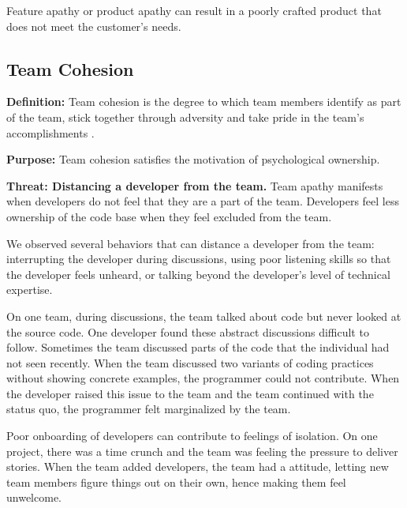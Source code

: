 
Feature apathy or product apathy can result in a poorly crafted product that does not meet the customer's needs.

\subsection{Team Cohesion}
\textbf{Definition:} Team cohesion is the degree to which team members identify as part of the team, stick together through adversity and take pride in the team's accomplishments \cite{Bollen1990Perceived, Beal2003Cohesion, Whitworth2007Motivation}.

\textbf{Purpose:} Team cohesion satisfies the  motivation of psychological ownership.

\textbf{Threat: Distancing a developer from the team.} Team apathy manifests when developers do not feel that they are a part of the team. Developers feel less ownership of the code base when they feel excluded from the team.

We observed several behaviors that can distance a developer from the team: interrupting the developer during discussions, using poor listening skills so that the developer feels unheard, or talking beyond the developer's level of technical expertise. 

On one team, during discussions, the team talked about code but never looked at the source code. One developer found these abstract discussions difficult to follow. Sometimes the team discussed parts of the code that the individual had not seen recently. When the team discussed two variants of coding practices without showing concrete examples, the programmer could not contribute. When the developer raised this issue to the team and the team continued with the status quo, the programmer felt marginalized by the team.

Poor onboarding of developers can contribute to feelings of isolation. On one project, there was a time crunch and the team was feeling the pressure to deliver stories. When the team added developers, the team had a  attitude, letting new team members figure things out on their own, hence making them feel unwelcome.

